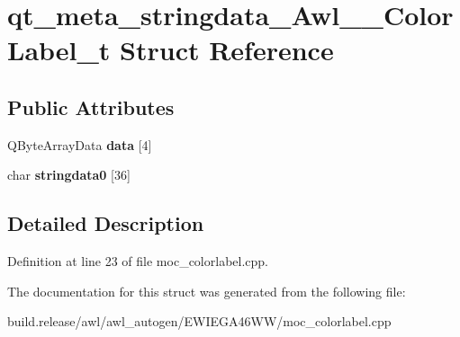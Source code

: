\hypertarget{structqt__meta__stringdata___awl_____color_label__t}{}\section{qt\+\_\+meta\+\_\+stringdata\+\_\+\+Awl\+\_\+\+\_\+\+Color\+Label\+\_\+t Struct Reference}
\label{structqt__meta__stringdata___awl_____color_label__t}
\subsection*{Public Attributes}
\begin{DoxyCompactItemize}
\item 
\mbox{\label{structqt__meta__stringdata___awl_____color_label__t_a14837fe2d2f8007c273e23fb713638e1}} 
Q\+Byte\+Array\+Data {\bfseries data} \mbox{[}4\mbox{]}
\item 
\mbox{\label{structqt__meta__stringdata___awl_____color_label__t_a6957440ef808a0921e1f51244491edc3}} 
char {\bfseries stringdata0} \mbox{[}36\mbox{]}
\end{DoxyCompactItemize}


\subsection{Detailed Description}


Definition at line 23 of file moc\+\_\+colorlabel.\+cpp.



The documentation for this struct was generated from the following file\+:\begin{DoxyCompactItemize}
\item 
build.\+release/awl/awl\+\_\+autogen/\+E\+W\+I\+E\+G\+A46\+W\+W/moc\+\_\+colorlabel.\+cpp\end{DoxyCompactItemize}
